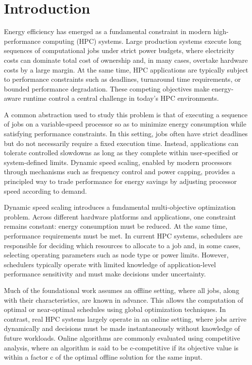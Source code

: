 \section{Introduction}\label{ch5:sec:Introduction}

Energy efficiency has emerged as a fundamental constraint in modern high-performance computing (HPC) systems. Large production systems execute long sequences of computational jobs under strict power budgets, where electricity costs can dominate total cost of ownership and, in many cases, overtake hardware costs by a large margin. At the same time, HPC applications are typically subject to performance constraints such as deadlines, turnaround time requirements, or bounded performance degradation. These competing objectives make energy-aware runtime control a central challenge in today’s HPC environments.

A common abstraction used to study this problem is that of executing a sequence of jobs on a variable-speed processor so as to minimize energy consumption while satisfying performance constraints. In this setting, jobs often have strict deadlines but do not necessarily require a fixed execution time. Instead, applications can tolerate controlled slowdowns as long as they complete within user-specified or system-defined limits. Dynamic speed scaling, enabled by modern processors through mechanisms such as frequency control and power capping, provides a principled way to trade performance for energy savings by adjusting processor speed according to demand.

Dynamic speed scaling introduces a fundamental multi-objective optimization problem. Across different hardware platforms and applications, one constraint remains constant: energy consumption must be reduced. At the same time, performance requirements must be met. In current HPC systems, schedulers are responsible for deciding which resources to allocate to a job and, in some cases, selecting operating parameters such as node type or power limits. However, schedulers typically operate with limited knowledge of application-level performance sensitivity and must make decisions under uncertainty.

Much of the foundational work assumes an offline setting, where all jobs, along with their characteristics, are known in advance. This allows the computation of optimal or near-optimal schedules using global optimization techniques. In contrast, real HPC systems largely operate in an online setting, where jobs arrive dynamically and decisions must be made instantaneously without knowledge of future workloads. Online algorithms are commonly evaluated using competitive analysis, where an algorithm is said to be c-competitive if its objective value is within a factor c of the optimal offline solution for the same input.

